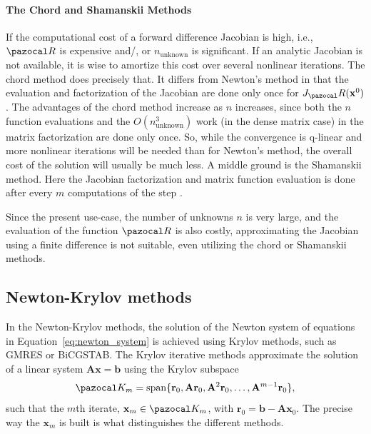 \paragraph{The Chord and Shamanskii Methods}

If the computational cost of a forward difference Jacobian is high, i.e., \(\pazocal R\) is expensive and/, or \(n_\text{unknown}\) is significant. If an analytic Jacobian is not available, it is wise to amortize this cost over several nonlinear iterations.
The chord method does precisely that.
It differs from Newton's method in that the evaluation and factorization of the Jacobian are done only once for \(J_\pazocal R(\mathbf x^0)\).
The advantages of the chord method increase as \(n\) increases, since both the \(n\) function evaluations and the \(O(n_\text{unknown}^{3})\) work (in the dense matrix case) in the matrix factorization are done only once.
So, while the convergence is q-linear and more nonlinear iterations will be needed than for Newton's method, the overall cost of the solution will usually be much less.
A middle ground is the Shamanskii method.
Here the Jacobian factorization and matrix function evaluation is done after every \(m\) computations of the step \citep{kelley_solving_2003}.

Since the present use-case, the number of unknowns \(n\) is very large, and the evaluation of the function \(\pazocal R\) is also costly, approximating the Jacobian using a finite difference is not suitable, even utilizing the chord or Shamanskii methods.


\subsection{Newton-Krylov methods}

In the Newton-Krylov methods, the solution of the Newton system of equations in Equation~\eqref{eq:newton_system} is achieved using Krylov methods, such as GMRES or BiCGSTAB.
The Krylov iterative methods approximate the solution of a linear system \(\mathbf A \mathbf x = \mathbf b\) using the Krylov subspace
\begin{equation}
  \pazocal K_m = \operatorname{span}\{\mathbf r_0, \mathbf A\mathbf r_0, \mathbf A^2 \mathbf r_0, \dots, \mathbf A^{m-1}\mathbf r_0\},
\end{equation}
such that the \(m\)th iterate, \(\mathbf x_m\in \pazocal K_m\), with \(\mathbf r_0 = \mathbf b - \mathbf A \mathbf x_0\).
The precise way the \(\mathbf x_m\) is built is what distinguishes the different methods.

